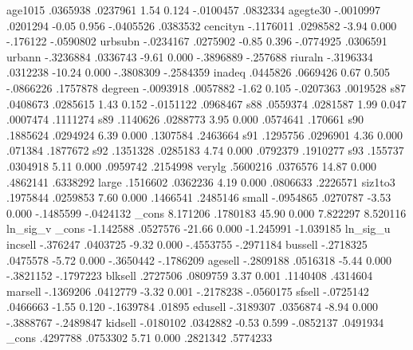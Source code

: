       age1015 {\VBAR}   .0365938   .0237961     1.54   0.124    -.0100457    .0832334
     agegte30 {\VBAR}  -.0010997   .0201294    -0.05   0.956    -.0405526    .0383532
     cencityn {\VBAR}  -.1176011   .0298582    -3.94   0.000     -.176122   -.0590802
      urbsubn {\VBAR}  -.0234167   .0275902    -0.85   0.396    -.0774925    .0306591
       urbann {\VBAR}  -.3236884   .0336743    -9.61   0.000    -.3896889    -.257688
      riuraln {\VBAR}  -.3196334   .0312238   -10.24   0.000    -.3808309   -.2584359
       inadeq {\VBAR}   .0445826   .0669426     0.67   0.505    -.0866226    .1757878
      degreen {\VBAR}  -.0093918   .0057882    -1.62   0.105    -.0207363    .0019528
          s87 {\VBAR}   .0408673   .0285615     1.43   0.152    -.0151122    .0968467
          s88 {\VBAR}   .0559374   .0281587     1.99   0.047     .0007474    .1111274
          s89 {\VBAR}   .1140626   .0288773     3.95   0.000     .0574641     .170661
          s90 {\VBAR}   .1885624   .0294924     6.39   0.000     .1307584    .2463664
          s91 {\VBAR}   .1295756   .0296901     4.36   0.000      .071384    .1877672
          s92 {\VBAR}   .1351328   .0285183     4.74   0.000     .0792379    .1910277
          s93 {\VBAR}    .155737   .0304918     5.11   0.000     .0959742    .2154998
       verylg {\VBAR}   .5600216   .0376576    14.87   0.000     .4862141    .6338292
        large {\VBAR}   .1516602   .0362236     4.19   0.000     .0806633    .2226571
      siz1to3 {\VBAR}   .1975844   .0259853     7.60   0.000     .1466541    .2485146
        small {\VBAR}  -.0954865   .0270787    -3.53   0.000    -.1485599   -.0424132
        _cons {\VBAR}   8.171206   .1780183    45.90   0.000     7.822297    8.520116
ln_sig_v      {\VBAR}
        _cons {\VBAR}  -1.142588   .0527576   -21.66   0.000    -1.245991   -1.039185
ln_sig_u      {\VBAR}
      incsell {\VBAR}   -.376247   .0403725    -9.32   0.000    -.4553755   -.2971184
      bussell {\VBAR}  -.2718325   .0475578    -5.72   0.000    -.3650442   -.1786209
      agesell {\VBAR}  -.2809188   .0516318    -5.44   0.000    -.3821152   -.1797223
      blksell {\VBAR}   .2727506   .0809759     3.37   0.001     .1140408    .4314604
      marsell {\VBAR}  -.1369206   .0412779    -3.32   0.001    -.2178238   -.0560175
       sfsell {\VBAR}  -.0725142   .0466663    -1.55   0.120    -.1639784      .01895
      edusell {\VBAR}  -.3189307   .0356874    -8.94   0.000    -.3888767   -.2489847
      kidsell {\VBAR}  -.0180102   .0342882    -0.53   0.599    -.0852137    .0491934
        _cons {\VBAR}   .4297788   .0753302     5.71   0.000     .2821342    .5774233
